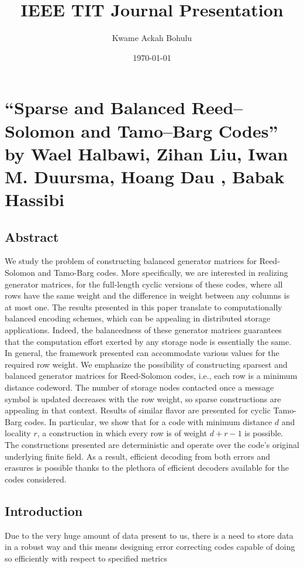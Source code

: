 \documentclass[11pt, oneside, dvipdfmx]{book}
\title{IEEE TIT Journal Presentation}
\author{Kwame Ackah Bohulu}
\date{\today}
\begin{document}
\maketitle

\chapter{``Sparse and Balanced Reed–Solomon and Tamo–Barg Codes'' by Wael Halbawi, Zihan Liu, Iwan M. Duursma, Hoang Dau , Babak Hassibi}

\section{Abstract}
We study the problem of constructing balanced generator matrices for Reed-Solomon and Tamo-Barg codes. More specifically, we are interested in realizing generator matrices, for the full-length cyclic versions of these codes, where all rows have the same weight and the difference in weight between any columns is at most one. The results presented in this paper translate to computationally balanced encoding schemes, which can be appealing in distributed storage applications. Indeed, the balancedness of these generator matrices guarantees that the computation effort exerted by any storage node is essentially the same. In general, the framework presented can accommodate various values for the required row weight. We emphasize the possibility of constructing sparsest and balanced generator matrices for Reed-Solomon codes, i.e., each row is a minimum distance codeword. The number of storage nodes contacted once a message symbol is updated decreases with the row weight, so sparse constructions are appealing in that context. Results of similar flavor are presented for cyclic Tamo-Barg codes. In particular, we show that for a code with minimum distance $d$ and locality $r$, a construction in which every row is of weight $d+r-1$ is possible. The constructions presented are deterministic and operate over the code's original underlying finite field. As a result, efficient decoding from both errors and erasures is possible thanks to the plethora of efficient decoders available for the codes considered.
\section{Introduction}
Due to the very huge amount of data present to us, there is a need to store data in a robust way and this means designing error correcting codes capable of doing so efficiently with respect to specified metrics
\end{document}
